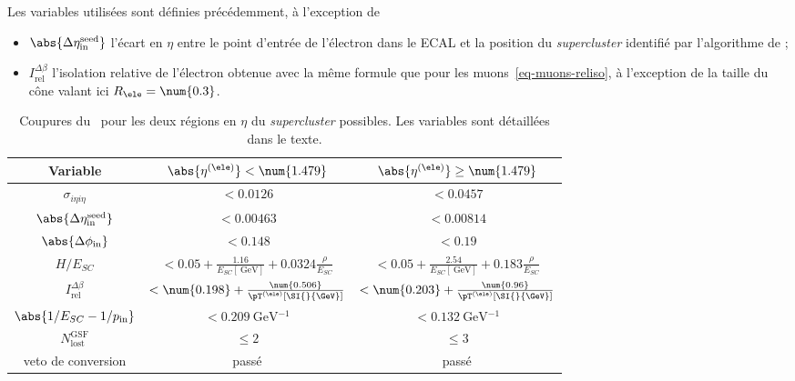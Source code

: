 Les variables utilisées sont définies précédemment, à l'exception de
\begin{itemize}
\item $\abs{\Delta\eta_\text{in}^\text{seed}}$ l'écart en $\eta$ entre le point d'entrée de l'électron dans le ECAL et la position du \emph{supercluster} identifié par l'algorithme de \PF;
\item $I_\text{rel}^{\Delta\beta}$ l'isolation relative de l'électron obtenue avec la même formule que pour les muons~\eqref{eq-muons-reliso}, à l'exception de la taille du cône valant ici $R_{\ele}=\num{0.3}$.
\end{itemize}
\begin{table}[h]
\centering
\begin{tabular}{ccc}
\toprule
Variable & $\abs{\eta^{(\ele)}} < \num{1.479}$ & $\abs{\eta^{(\ele)}} \geq \num{1.479}$ \\
\midrule
$\sigma_{i\eta i\eta}$ & $<\num{0.0126}$ & $<\num{0.0457}$ \\
$\abs{\Delta\eta_\text{in}^\text{seed}}$ & $<\num{0.00463}$ & $<\num{0.00814}$ \\
$\abs{\Delta\phi_\text{in}}$ & $<\num{0.148}$ & $<\num{0.19}$ \\
$H/E_{SC}$ & $<\num{0.05}+\frac{\num{1.16}}{E_{SC} [\SI{}{\GeV}]} + \num{0.0324}\frac{\rho}{E_{SC}}$ & $<\num{0.05}+\frac{\num{2.54}}{E_{SC} [\SI{}{\GeV}]} + \num{0.183}\frac{\rho}{E_{SC}}$ \\
$I_\text{rel}^{\Delta\beta}$ & $<\num{0.198} + \frac{\num{0.506}}{\pT^{(\ele)} [\SI{}{\GeV}]}$ & $<\num{0.203} + \frac{\num{0.96}}{\pT^{(\ele)} [\SI{}{\GeV}]}$ \\
$\abs{1/E_{SC}-1/p_\text{in}}$ & $<\SI{0.209}{\GeV^{-1}}$ & $<\SI{0.132}{\GeV^{-1}}$ \\
$N_\text{lost}^\text{GSF}$ & $\leq\num{2}$ & $\leq\num{3}$ \\
veto de conversion & passé & passé \\
\bottomrule
\end{tabular}
\caption[Coupures du \CutBasedEleIDVeto.]{Coupures du \CutBasedEleIDVeto\ pour les deux régions en $\eta$ du \emph{supercluster} possibles. Les variables sont détaillées dans le texte.}
\label{tab-CutBasedEleIDVeto}
\end{table}
